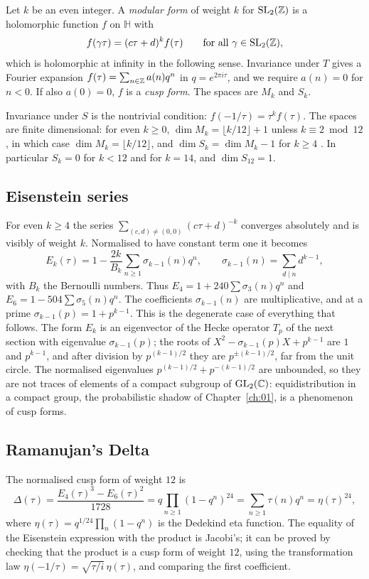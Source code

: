 \begin{definition}
Let $k$ be an even integer. A \emph{modular form} of weight $k$ for $\mathrm{SL}_2(\mathbb{Z})$ is a holomorphic function $f$ on $\mathbb H$ with
\[
f(\gamma\tau)=(c\tau+d)^kf(\tau)\qquad\text{for all }\gamma\in\mathrm{SL}_2(\mathbb{Z}),
\]
which is holomorphic at infinity in the following sense. Invariance under $T$ gives a Fourier expansion $f(\tau)=\sum_{n\in\mathbb{Z}}a(n)q^n$ in $q=e^{2\pi i\tau}$, and we require $a(n)=0$ for $n<0$. If also $a(0)=0$, $f$ is a \emph{cusp form}. The spaces are $M_k$ and $S_k$.
\end{definition}

Invariance under $S$ is the nontrivial condition: $f(-1/\tau)=\tau^kf(\tau)$. The spaces are finite dimensional: for even $k\ge0$, $\dim M_k=\lfloor k/12\rfloor+1$ unless $k\equiv2\bmod12$, in which case $\dim M_k=\lfloor k/12\rfloor$, and $\dim S_k=\dim M_k-1$ for $k\ge4$ \cite{serre1973}. In particular $S_k=0$ for $k<12$ and for $k=14$, and $\dim S_{12}=1$.

\subsection{Eisenstein series}
For even $k\ge4$ the series $\sum_{(c,d)\neq(0,0)}(c\tau+d)^{-k}$ converges absolutely and is visibly of weight $k$. Normalised to have constant term one it becomes
\[
E_k(\tau)=1-\frac{2k}{B_k}\sum_{n\ge1}\sigma_{k-1}(n)q^n,\qquad\sigma_{k-1}(n)=\sum_{d\mid n}d^{k-1},
\]
with $B_k$ the Bernoulli numbers. Thus $E_4=1+240\sum\sigma_3(n)q^n$ and $E_6=1-504\sum\sigma_5(n)q^n$. The coefficients $\sigma_{k-1}(n)$ are multiplicative, and at a prime $\sigma_{k-1}(p)=1+p^{k-1}$. This is the degenerate case of everything that follows. The form $E_k$ is an eigenvector of the Hecke operator $T_p$ of the next section with eigenvalue $\sigma_{k-1}(p)$; the roots of $X^2-\sigma_{k-1}(p)X+p^{k-1}$ are $1$ and $p^{k-1}$, and after division by $p^{(k-1)/2}$ they are $p^{\pm(k-1)/2}$, far from the unit circle. The normalised eigenvalues $p^{(k-1)/2}+p^{-(k-1)/2}$ are unbounded, so they are not traces of elements of a compact subgroup of $\mathrm{GL}_2(\mathbb{C})$: equidistribution in a compact group, the probabilistic shadow of Chapter~\ref{ch:01}, is a phenomenon of cusp forms.

\subsection{Ramanujan's Delta}
The normalised cusp form of weight $12$ is
\[
\Delta(\tau)=\frac{E_4(\tau)^3-E_6(\tau)^2}{1728}=q\prod_{n\ge1}(1-q^n)^{24}=\sum_{n\ge1}\tau(n)q^n=\eta(\tau)^{24},
\]
where $\eta(\tau)=q^{1/24}\prod_n(1-q^n)$ is the Dedekind eta function. The equality of the Eisenstein expression with the product is Jacobi's; it can be proved by checking that the product is a cusp form of weight $12$, using the transformation law $\eta(-1/\tau)=\sqrt{\tau/i}\,\eta(\tau)$, and comparing the first coefficient.

